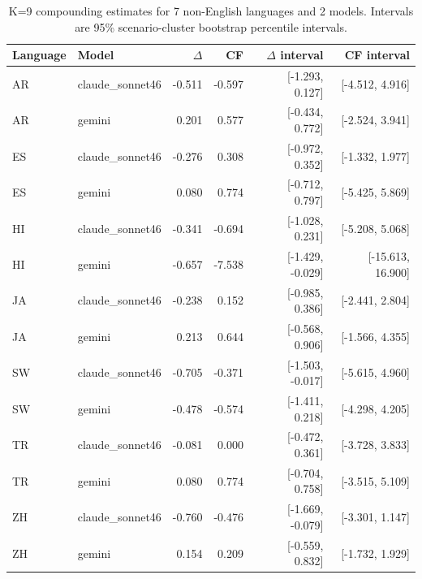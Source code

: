 \begin{table}[t]
\centering
\small
\caption{K=9 compounding estimates for 7 non-English languages and 2 models. Intervals are 95\% scenario-cluster bootstrap percentile intervals.}
\label{tab:newstudy20261010\_expansion_results}
\begin{tabular}{llrrrr}
\hline
Language & Model & $\Delta$ & CF & $\Delta$ interval & CF interval \\
\hline
AR & claude\_sonnet46 & -0.511 & -0.597 & [-1.293, 0.127] & [-4.512, 4.916] \\
AR & gemini & 0.201 & 0.577 & [-0.434, 0.772] & [-2.524, 3.941] \\
ES & claude\_sonnet46 & -0.276 & 0.308 & [-0.972, 0.352] & [-1.332, 1.977] \\
ES & gemini & 0.080 & 0.774 & [-0.712, 0.797] & [-5.425, 5.869] \\
HI & claude\_sonnet46 & -0.341 & -0.694 & [-1.028, 0.231] & [-5.208, 5.068] \\
HI & gemini & -0.657 & -7.538 & [-1.429, -0.029] & [-15.613, 16.900] \\
JA & claude\_sonnet46 & -0.238 & 0.152 & [-0.985, 0.386] & [-2.441, 2.804] \\
JA & gemini & 0.213 & 0.644 & [-0.568, 0.906] & [-1.566, 4.355] \\
SW & claude\_sonnet46 & -0.705 & -0.371 & [-1.503, -0.017] & [-5.615, 4.960] \\
SW & gemini & -0.478 & -0.574 & [-1.411, 0.218] & [-4.298, 4.205] \\
TR & claude\_sonnet46 & -0.081 & 0.000 & [-0.472, 0.361] & [-3.728, 3.833] \\
TR & gemini & 0.080 & 0.774 & [-0.704, 0.758] & [-3.515, 5.109] \\
ZH & claude\_sonnet46 & -0.760 & -0.476 & [-1.669, -0.079] & [-3.301, 1.147] \\
ZH & gemini & 0.154 & 0.209 & [-0.559, 0.832] & [-1.732, 1.929] \\
\hline
\end{tabular}
\end{table}
